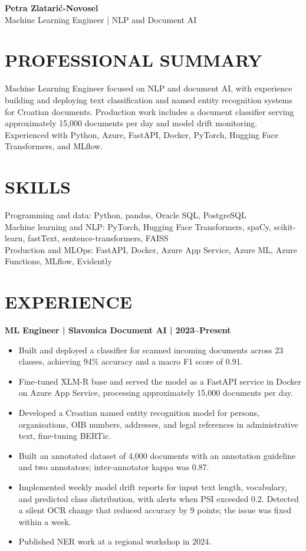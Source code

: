 \documentclass[11pt,a4paper]{article}
\begin{document}
\begin{center}
{\Huge\bfseries\color{primarycolor} Petra Zlatarić-Novosel}\\[0.35em]
{\large\color{accentcolor} Machine Learning Engineer | NLP and Document AI}
\end{center}
\vspace{0.4em}

\section*{PROFESSIONAL SUMMARY}
Machine Learning Engineer focused on NLP and document AI, with experience building and deploying text classification and named entity recognition systems for Croatian documents. Production work includes a document classifier serving approximately 15,000 documents per day and model drift monitoring. Experienced with Python, Azure, FastAPI, Docker, PyTorch, Hugging Face Transformers, and MLflow.

\section*{SKILLS}
Programming and data: Python, pandas, Oracle SQL, PostgreSQL\\
Machine learning and NLP: PyTorch, Hugging Face Transformers, spaCy, scikit-learn, fastText, sentence-transformers, FAISS\\
Production and MLOps: FastAPI, Docker, Azure App Service, Azure ML, Azure Functions, MLflow, Evidently

\section*{EXPERIENCE}
\textbf{ML Engineer | Slavonica Document AI | 2023–Present}
\begin{itemize}
\item Built and deployed a classifier for scanned incoming documents across 23 classes, achieving 94\% accuracy and a macro F1 score of 0.91.
\item Fine-tuned XLM-R base and served the model as a FastAPI service in Docker on Azure App Service, processing approximately 15,000 documents per day.
\item Developed a Croatian named entity recognition model for persons, organisations, OIB numbers, addresses, and legal references in administrative text, fine-tuning BERTic.
\item Built an annotated dataset of 4,000 documents with an annotation guideline and two annotators; inter-annotator kappa was 0.87.
\item Implemented weekly model drift reports for input text length, vocabulary, and predicted class distribution, with alerts when PSI exceeded 0.2. Detected a silent OCR change that reduced accuracy by 9 points; the issue was fixed within a week.
\item Published NER work at a regional workshop in 2024.
\end{itemize}
\end{document}
